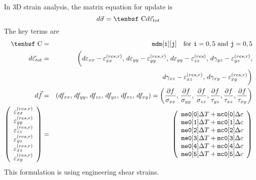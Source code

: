 \documentclass[11pt]{article}
\def\C{\hbox{\tenbsf C}}
\def\code#1{{\small\tt #1}}
\def\deff{d \vec{\varepsilon}_{tot}}
\def\df{d \vec{f}}
\def\dsig{d \vec{\sigma}}
\def\DT{\Delta T}
\def\e#1{\varepsilon_{#1}}
\def\er#1{\varepsilon_{#1}^{(res)}}
\def\err#1{\varepsilon_{#1}^{(res,r)}}
\def\g#1{\gamma_{#1}}
\begin{document}
In 3D strain analysis, the matrix equation for update is
\begin{equation}
    \dsig = \C \deff 
\end{equation}
The key terms are
\begin{eqnarray}
      \C & = & \code{mdm[i][j]} \quad {\rm for\ }\code{i}=0,5\ {\rm and\ }\code{j}=0,5 \\
       \deff & = & \biggl(d\e{xx} - \err{xx}, \thinspace d\e{yy} - \err{yy}, \thinspace  d\e{yy}-  \er{zz}, 
             \thinspace d\g{yz}-\err{yz},  \nonumber\\
             && \qquad\mbox{} \thinspace d\g{xz}-\err{xz},  \thinspace d\g{xy}-\err{xy}\biggr) \\
      \df & = & (df_{xx}, \thinspace df_{yy}, \thinspace df_{zz}, \thinspace df_{yz}, \thinspace df_{xz}, \thinspace df_{xy})
                  = \left({\partial f\over \sigma_{xx}}, \thinspace {\partial f\over \sigma_{yy}}, \thinspace {\partial f\over \sigma_{zz}},
                                {\partial f\over \tau_{yz}}, {\partial f\over \tau_{xz}}, {\partial f\over \tau_{xy}}\right)  \\
\left(\begin{array}{c} \err{xx} \\ \err{yy} \\ \err{zz} \\  \err{yz} \\ \err{xz} \\ \err{xy} \end{array}\right)
       & = &  \left(\begin{array}{c}
	\code{me0[0]}\DT + \code{mc0[0]}\Delta c \\
	\code{me0[1]}\DT + \code{mc0[1]}\Delta c \\
	\code{me0[2]}\DT + \code{mc0[2]}\Delta c \\
	\code{me0[3]}\DT + \code{mc0[3]}\Delta c \\
	\code{me0[4]}\DT + \code{mc0[4]}\Delta c \\
	\code{me0[5]}\DT + \code{mc0[5]}\Delta c 
 \end{array}\right) 
 \end{eqnarray}
This formulation is using engineering shear strains. 
 
\end{document}
